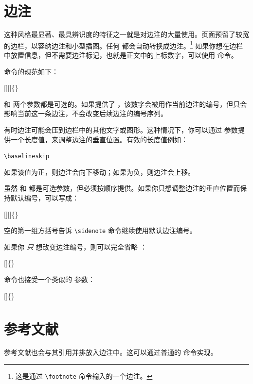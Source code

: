 \section{边注}\label{sec:sidenotes}
这种风格最显著、最具辨识度的特征之一就是对边注的大量使用。页面预留了较宽的边栏，以容纳边注和小型插图。任何  都会自动转换成边注。\footnote{这是通过 \texttt{\textbackslash footnote} 命令输入的一个边注。} 如果你想在边栏中放置信息，但不需要边注标记，也就是正文中的上标数字，可以使用  命令。

 命令的规范如下：
\begin{docspec}
  [][]\{\}
\end{docspec}

 和  两个参数都是可选的。如果提供了 ，该数字会被用作当前边注的编号，但只会影响当前这一条边注，不会改变后续边注的编号序列。

有时边注可能会压到边栏中的其他文字或图形。这种情况下，你可以通过  参数提供一个长度值，来调整边注的垂直位置。有效的长度值例如：
\begin{docspec}
  \ttfamily 1.0in \qquad 2.54cm \qquad 254mm \Verb|\baselineskip|
\end{docspec}
如果该值为正，则边注会向下移动；如果为负，则边注会上移。

虽然  和  都是可选参数，但必须按顺序提供。如果你只想调整边注的垂直位置而保持默认编号，可以写成：
\begin{docspec}
  [][]\{\}
\end{docspec}
空的第一组方括号告诉 \Verb|\sidenote| 命令继续使用默认边注编号。

如果你 \emph{只} 想改变边注编号，则可以完全省略 ：
\begin{docspec}
  []\{\}
\end{docspec}

 命令也接受一个类似的  参数：
\begin{docspec}
  []\{\}
\end{docspec}

\section{参考文献}
参考文献也会与其引用并排放入边注中。这可以通过普通的  命令实现。

